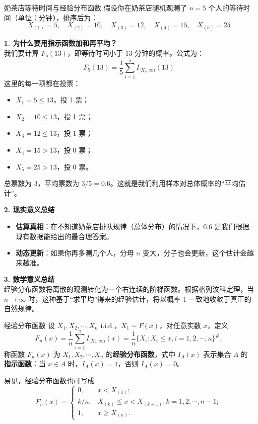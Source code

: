 \begin{example}{奶茶店等待时间与经验分布函数}
假设你在奶茶店随机观测了 $n=5$ 个人的等待时间（单位：分钟），排序后为：
\[ X_{(1)}=5, \quad X_{(2)}=10, \quad X_{(3)}=12, \quad X_{(4)}=15, \quad X_{(5)}=25 \]

\textbf{1. 为什么要用指示函数加和再平均？} \\
我们要计算 $F_5(13)$，即等待时间小于 13 分钟的概率。公式为：
\[ F_5(13) = \frac{1}{5} \sum_{i=1}^5 I_{[X_i, \infty)}(13) \]
这里的每一项都在投票：
\begin{itemize}
    \item $X_1=5 \leqslant 13$，投 1 票；
    \item $X_2=10 \leqslant 13$，投 1 票；
    \item $X_3=12 \leqslant 13$，投 1 票；
    \item $X_4=15 > 13$，投 0 票；
    \item $X_5=25 > 13$，投 0 票。
\end{itemize}
总票数为 3，平均票数为 $3/5 = 0.6$。这就是我们利用样本对总体概率的“平均估计”。

\textbf{2. 现实意义总结} \\
\begin{itemize}
    \item \textbf{估算真相}：在不知道奶茶店排队规律（总体分布）的情况下，$0.6$ 是我们根据现有数据能给出的最合理答案。
    \item \textbf{动态更新}：如果你再多测几个人，分母 $n$ 变大，分子也会更新，这个估计会越来越准。
\end{itemize}

\textbf{3. 数学意义总结} \\
经验分布函数将离散的观测转化为一个右连续的阶梯函数。根据格列汶科定理，当 $n \to \infty$ 时，这种基于“求平均”得来的经验估计，将以概率 1 一致地收敛于真正的自然规律。
\end{example}
\begin{definition}{经验分布函数}
    设 $X_1, X_2, \cdots, X_n$ i.i.d.，$X_1 \sim F(x)$，对任意实数 $x$，定义
    \begin{equation}
        F_n(x) = \frac{1}{n} \sum_{i=1}^n I_{[X_i, \infty)}(x) = \frac{1}{n} \{X_i : X_i \leqslant x, i = 1, 2, \cdots, n\}^\#, \tag{2.2.6}
    \end{equation}
    称函数 $F_n(x)$ 为 $X_1, X_2, \cdots, X_n$ 的\textbf{经验分布函数}，式中 $I_A(x)$ 表示集合 $A$ 的\textbf{指示函数}：当 $x \in A$ 时，$I_A(x) = 1$，否则 $I_A(x) = 0$。

    易见，经验分布函数也可写成
    \begin{equation}
        F_n(x) = \begin{cases} 
            0, & x < X_{(1)}; \\ 
            k/n, & X_{(k)} \leqslant x < X_{(k+1)}, k = 1, 2, \cdots, n - 1; \\ 
            1, & x \geqslant X_{(n)}. 
        \end{cases} \tag{2.2.7}
    \end{equation}
\end{definition}
